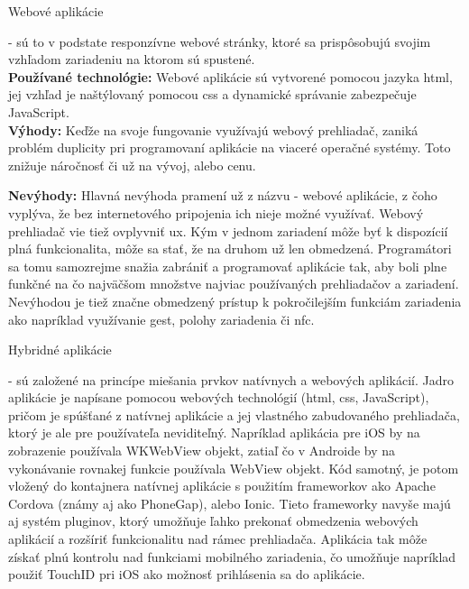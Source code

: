 \begin{itemize}[leftmargin=*]
{\bf \item Webové aplikácie} - sú to v podstate responzívne webové stránky, ktoré sa prispôsobujú svojim vzhľadom zariadeniu na ktorom sú spustené. \cite{ma3} \\

{\bf Používané technológie:} Webové aplikácie sú vytvorené pomocou jazyka \acrshort{html}, jej vzhľad je naštýlovaný pomocou \acrshort{css} a dynamické správanie zabezpečuje JavaScript. \\

{\bf Výhody:} Keďže na svoje fungovanie využívajú webový prehliadač, zaniká problém duplicity pri programovaní aplikácie na viaceré operačné systémy. Toto znižuje náročnosť či už na vývoj, alebo cenu. \cite{ma3} \

{\bf Nevýhody:} Hlavná nevýhoda pramení už z názvu - webové aplikácie, z čoho vyplýva, že bez internetového pripojenia ich nieje možné využívať. Webový prehliadač vie tiež ovplyvniť \acrshort{ux}. Kým v jednom zariadení môže byť k dispozícií plná funkcionalita, môže sa stať, že na druhom už len obmedzená. Programátori sa tomu samozrejme snažia zabrániť a programovať aplikácie tak, aby boli plne funkčné na čo najväčšom množstve najviac používaných prehliadačov a zariadení. Nevýhodou je tiež značne obmedzený prístup k pokročilejším funkciám zariadenia ako napríklad využívanie gest, polohy zariadenia či \acrshort{nfc}. \cite{ma3} \\
 
{\bf \item Hybridné aplikácie} - sú založené na princípe miešania prvkov natívnych a webových aplikácií. Jadro aplikácie je napísane pomocou webových technológií (\acrshort{html}, \acrshort{css}, JavaScript), pričom je spúšťané z natívnej aplikácie a jej vlastného zabudovaného prehliadača, ktorý je ale pre používateľa neviditeľný. Napríklad aplikácia pre iOS by na zobrazenie používala WKWebView objekt, zatiaľ čo v Androide by na vykonávanie rovnakej funkcie používala WebView objekt. Kód samotný, je potom vložený do kontajnera natívnej aplikácie s použitím frameworkov ako Apache Cordova (známy aj ako PhoneGap), alebo Ionic. Tieto frameworky navyše majú aj systém pluginov, ktorý umožňuje ľahko prekonať obmedzenia webových aplikácií a rozšíriť funkcionalitu nad rámec prehliadača. Aplikácia tak môže získať plnú kontrolu nad funkciami mobilného zariadenia, čo umožňuje napríklad použiť TouchID pri iOS ako možnosť prihlásenia sa do aplikácie. \cite{ma4} \\



\end{itemize}
